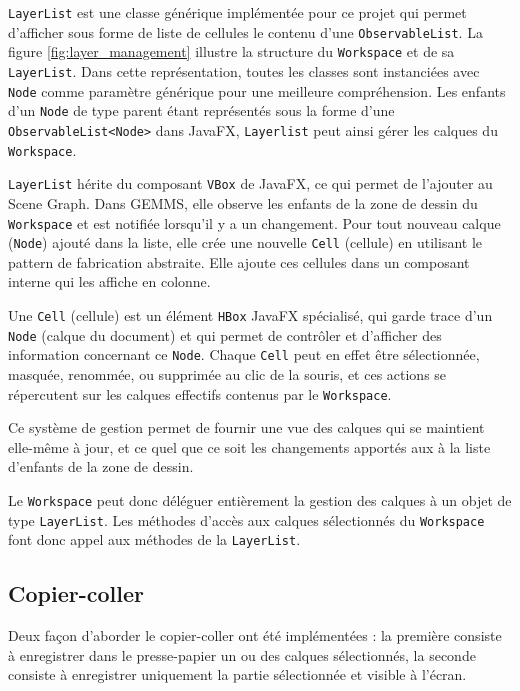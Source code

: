 \texttt{LayerList} est une classe générique implémentée pour ce projet qui permet d'afficher sous forme de liste de cellules le contenu d'une \texttt{ObservableList}. La figure \ref{fig:layer_management} illustre la structure du \texttt{Workspace} et de sa \texttt{LayerList}. Dans cette représentation, toutes les classes sont instanciées avec \texttt{Node} comme paramètre générique pour une meilleure compréhension. Les enfants d'un \texttt{Node} de type parent étant représentés sous la forme d'une \texttt{ObservableList<Node>} dans JavaFX, \texttt{Layerlist} peut ainsi gérer les calques du \texttt{Workspace}.

\texttt{LayerList} hérite du composant \texttt{VBox} de JavaFX, ce qui permet de l'ajouter au Scene Graph. Dans GEMMS, elle observe les enfants de la zone de dessin du \texttt{Workspace} et est notifiée lorsqu'il y a un changement. Pour tout nouveau calque (\texttt{Node}) ajouté dans la liste, elle crée une nouvelle \texttt{Cell} (cellule) en utilisant le pattern de fabrication abstraite. Elle ajoute ces cellules dans un composant interne qui les affiche en colonne.

Une \texttt{Cell} (cellule) est un élément \texttt{HBox} JavaFX spécialisé, qui garde trace d'un \texttt{Node} (calque du document) et qui permet de contrôler et d'afficher des information concernant ce \texttt{Node}. Chaque \texttt{Cell} peut en effet être sélectionnée, masquée, renommée, ou supprimée au clic de la souris, et ces actions se répercutent sur les calques effectifs contenus par le \texttt{Workspace}. 

Ce système de gestion permet de fournir une vue des calques qui se maintient elle-même à jour, et ce quel que ce soit les changements apportés aux à la liste d'enfants de la zone de dessin.

Le \texttt{Workspace} peut donc déléguer entièrement la gestion des calques à un objet de type \texttt{LayerList}. Les méthodes d'accès aux calques sélectionnés du \texttt{Workspace} font donc appel aux méthodes de la \texttt{LayerList}.



\subsection{Copier-coller}
\label{sec:copiercoller}
Deux façon d'aborder le copier-coller ont été implémentées : la première consiste à enregistrer dans le presse-papier un ou des calques sélectionnés, la seconde consiste à enregistrer uniquement la partie sélectionnée et visible à l'écran.


